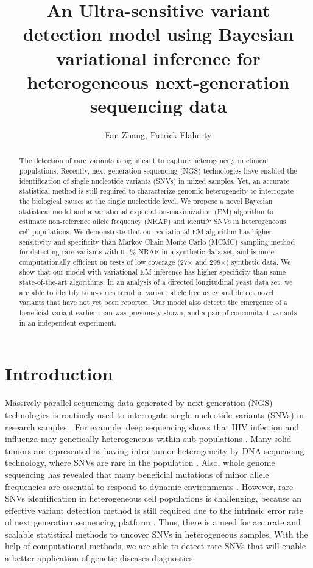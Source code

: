 \documentclass[11pt,reqno]{amsart}
\title[]{An Ultra-sensitive variant detection model using Bayesian variational inference for heterogeneous next-generation sequencing data}
\author{Fan Zhang, Patrick Flaherty}
\begin{document}
\maketitle

\begin{abstract}
The detection of rare variants is significant to capture heterogeneity in clinical populations.
Recently, next-generation sequencing (NGS) technologies have enabled the identification of single nucleotide variants (SNVs) in mixed samples.
Yet, an accurate statistical method is still required to characterize genomic heterogeneity to interrogate the biological causes at the single nucleotide level.
We propose a novel Bayesian statistical model and a variational expectation-maximization (EM) algorithm to estimate non-reference allele frequency (NRAF) and identify SNVs in heterogeneous cell populations.
We demonstrate that our variational EM algorithm has higher sensitivity and specificity than Markov Chain Monte Carlo (MCMC) sampling method for detecting rare variants with 0.1\% NRAF in a synthetic data set,
and is more computationally efficient on tests of low coverage (27$\times$ and 298$\times$) synthetic data.
We show that our model with variational EM inference has higher specificity than some state-of-the-art algorithms.
In an analysis of a directed longitudinal yeast data set, we are able to identify time-series trend in variant allele frequency and detect novel variants that have not yet been reported.
Our model also detects the emergence of a beneficial variant earlier than was previously shown, and a pair of concomitant variants in an independent experiment.
\end{abstract}

\section{Introduction}
Massively parallel sequencing data generated by next-generation (NGS) technologies is routinely used to interrogate single nucleotide variants (SNVs) in research samples \citep{koboldt2013next}.
For example, deep sequencing shows that HIV infection and influenza may genetically heterogeneous within sub-populations \citep{flaherty2011ultrasensitive}.
Many solid tumors are represented as having intra-tumor heterogeneity by DNA sequencing technology, where SNVs are rare in the population \citep{navin2010inferring}.
Also, whole genome sequencing has revealed that many beneficial mutations of minor allele frequencies are essential to respond to dynamic environments \citep{kvitek2013whole}.
However, rare SNVs identification in heterogeneous cell populations is challenging, because an effective variant detection method is still required due to the intrinsic error rate of next generation sequencing platform \citep{shendure2008next}.
Thus, there is a need for accurate and scalable statistical methods to uncover SNVs in heterogeneous samples.
With the help of computational methods, we are able to detect rare SNVs that will enable a better application of genetic diseases diagnostics.
\end{document}

